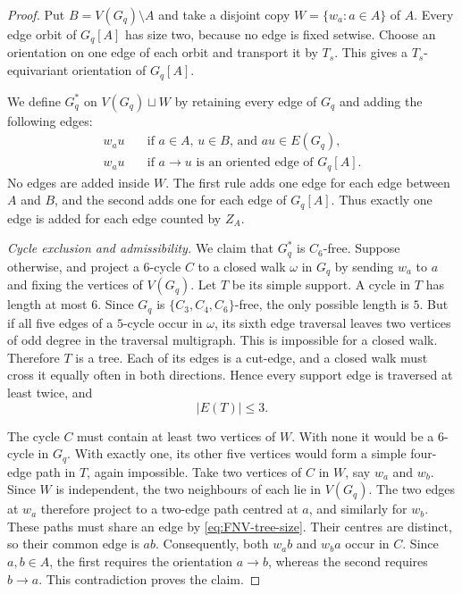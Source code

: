 \documentclass{article}
\theoremstyle{definition}
\theoremstyle{remark}
\begin{document}
\begin{proof}
Put $B=V(G_q)\setminus A$ and take a disjoint copy
$W=\{w_a:a\in A\}$ of $A$.  Every edge orbit of $G_q[A]$ has size
two, because no edge is fixed setwise.  Choose an orientation on one edge
of each orbit and transport it by $T_s$.  This gives a
$T_s$-equivariant orientation of $G_q[A]$.

We define $G_q^*$ on $V(G_q)\sqcup W$ by retaining every edge of
$G_q$ and adding the following edges:
\begin{align}
w_au&\quad\text{if $a\in A$, $u\in B$, and $au\in E(G_q)$},
\label{eq:expansion-AB}\\
w_au&\quad\text{if $a\to u$ is an oriented edge of $G_q[A]$}.
\label{eq:expansion-AA}
\end{align}
No edges are added inside $W$.  The first rule adds one edge for each
edge between $A$ and $B$, and the second adds one for each edge of
$G_q[A]$.  Thus exactly one edge is added for each edge counted by $Z_A$.

\emph{Cycle exclusion and admissibility.}
We claim that $G_q^*$ is $C_6$-free.  Suppose otherwise, and project a
$6$-cycle $C$ to a closed walk $\omega$ in $G_q$ by sending $w_a$ to
$a$ and fixing the vertices of $V(G_q)$.  Let $T$ be its simple support.
A cycle in $T$ has length at most $6$.  Since $G_q$ is
$\{C_3,C_4,C_6\}$-free, the only possible length is $5$.  But if all
five edges of a $5$-cycle occur in $\omega$, its sixth edge traversal
leaves two vertices of odd degree in the traversal multigraph.  This is
impossible for a closed walk.  Therefore $T$ is a tree.  Each of its
edges is a cut-edge, and a closed walk must cross it equally often in
both directions.  Hence every support edge is traversed at least twice,
and
\begin{equation}\label{eq:FNV-tree-size}
|E(T)|\leq3.
\end{equation}

The cycle $C$ must contain at least two vertices of $W$.  With none it
would be a $6$-cycle in $G_q$.  With exactly one, its other five vertices
would form a simple four-edge path in $T$, again impossible.  Take two
vertices of $C$ in $W$, say $w_a$ and $w_b$.  Since $W$ is independent,
the two neighbours of each lie in $V(G_q)$.  The two edges at $w_a$
therefore project to a two-edge path centred at $a$, and similarly for
$w_b$.  These paths must share an edge by \eqref{eq:FNV-tree-size}.
Their centres are distinct, so their common edge is $ab$.
Consequently, both $w_ab$ and $w_ba$ occur in $C$.  Since $a,b\in A$,
the first requires the orientation $a\to b$, whereas the second requires
$b\to a$.  This contradiction proves the claim.


\end{proof}
\end{document}
